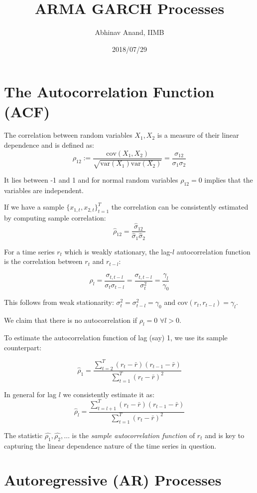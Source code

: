 \documentclass[11pt,]{article}
\title{ARMA GARCH Processes}
\author{Abhinav Anand, IIMB}
\date{2018/07/29}
\begin{document}
\maketitle

\section{The Autocorrelation Function
(ACF)}\label{the-autocorrelation-function-acf}

The correlation between random variables \(X_1, X_2\) is a measure of
their linear dependence and is defined as:
\[\rho_{12}:= \frac{\text{cov}(X_1,X_2)}{\sqrt{\text{var}(X_1)\text{var}(X_2)}}=\frac{\sigma_{12}}{\sigma_1\sigma_2}\]

It lies between -1 and 1 and for normal random variables \(\rho_{12}=0\)
implies that the variables are independent.

If we have a sample \(\{x_{1,t}, x_{2,t}\}_{t=1}^T\) the correlation can
be consistently estimated by computing sample correlation:
\[\hat{\rho}_{12}=\frac{\hat{\sigma}_{12}}{\hat{\sigma}_1\hat{\sigma}_2}\]

For a time series \(r_t\) which is weakly stationary, the lag-\(l\)
autocorrelation function is the correlation between \(r_t\) and
\(r_{t-l}\):

\[\rho_l=\frac{\sigma_{t,t-l}}{\sigma_t\sigma_{t-l}}=\frac{\sigma_{t,t-l}}{\sigma_t^2}
=\frac{\gamma_l}{\gamma_0}\]

This follows from weak stationarity:
\(\sigma^2_t=\sigma^2_{t-l}=\gamma_0\) and
\(\text{cov}(r_t,r_{t-l})=\gamma_l\).

We claim that there is no autocorrelation if \(\rho_l=0\)
\(\forall l>0\).

To estimate the autocorrelation function of lag (say) 1, we use its
sample counterpart:

\[\hat{\rho}_1=\frac{\sum_{t=2}^T (r_t-\bar{r})(r_{t-1}-\bar{r})}{\sum_{t=1}^T (r_t-\bar{r})^2}\]

In general for lag \(l\) we consistently estimate it as:
\[\hat{\rho}_l=\frac{\sum_{t=l+1}^T (r_t-\bar{r})(r_{t-1}-\bar{r})}{\sum_{t=1}^T (r_t-\bar{r})^2}\]

The statistic \(\hat{\rho_1},\hat{\rho_2},\hdots\) is the \emph{sample
autocorrelation function} of \(r_t\) and is key to capturing the linear
dependence nature of the time series in question.

\section{Autoregressive (AR)
Processes}\label{autoregressive-ar-processes}
\end{document}
